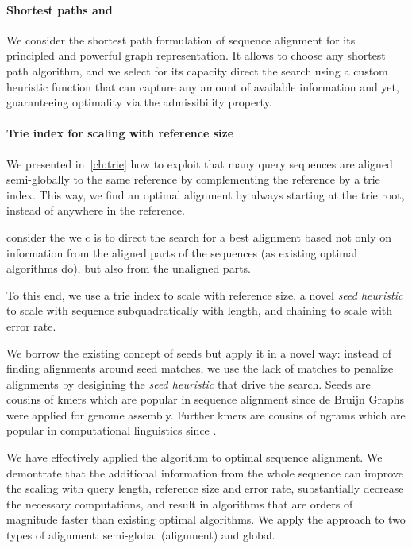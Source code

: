 \paragraph{Shortest paths and \A}
We consider the shortest path formulation of sequence alignment for its
principled and powerful graph representation. It allows to choose any shortest
path algorithm, and we select \A for its capacity direct the search using a
custom heuristic function that can capture any amount of available information
and yet, guaranteeing optimality via the admissibility property.


\paragraph{Trie index for scaling with reference size}
We presented in~\cref{ch:trie} how to exploit that many query sequences are
aligned semi-globally to the same reference by complementing the reference by a
trie index. This way, we find an optimal alignment by always starting at the
trie root, instead of anywhere in the reference.

consider the we c is to
direct the search for a best alignment based not only on information from the
aligned parts of the sequences (as existing optimal algorithms do), but also
from the unaligned parts. 

To this end, we use a trie index to scale with reference size, a novel
\emph{seed heuristic} to scale with sequence subquadratically with length, and
chaining to scale with error rate.

We borrow the existing concept of seeds but apply it in a novel way: instead of
finding alignments around seed matches, we use the lack of matches to penalize
alignments by desigining the \emph{seed heuristic} that drive the \A search.
Seeds are cousins of kmers which are popular in sequence alignment since de
Bruijn Graphs were applied for genome assembly. Further kmers are cousins of
ngrams which are popular in computational linguistics since .

We have effectively applied the \A algorithm to optimal sequence alignment. We
demontrate that the additional information from the whole sequence can improve
the scaling with query length, reference size and error rate, substantially
decrease the necessary computations, and result in algorithms that are orders of
magnitude faster than existing optimal algorithms. We apply the \A approach to
two types of alignment: semi-global (alignment) and global.

